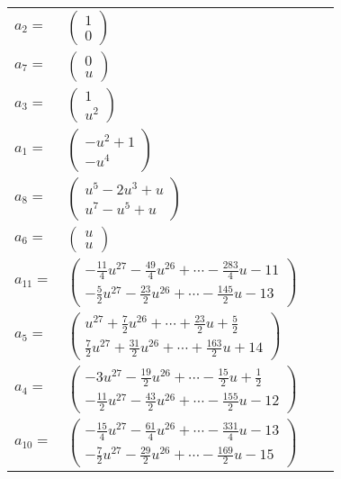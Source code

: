 \documentclass[1p]{elsarticle_modified}
\theoremstyle{definition}
\begin{document}
\begin{tabular}{m{7pt} m{180pt} m{7pt} m{180pt} }
\flushright $a_{2}=$&$\begin{pmatrix}1\\0\end{pmatrix}$ \\
\flushright $a_{7}=$&$\begin{pmatrix}0\\u\end{pmatrix}$ \\
\flushright $a_{3}=$&$\begin{pmatrix}1\\u^2\end{pmatrix}$ \\
\flushright $a_{1}=$&$\begin{pmatrix}- u^2+1\\- u^4\end{pmatrix}$ \\
\flushright $a_{8}=$&$\begin{pmatrix}u^5-2 u^3+u\\u^7- u^5+u\end{pmatrix}$ \\
\flushright $a_{6}=$&$\begin{pmatrix}u\\u\end{pmatrix}$ \\
\flushright $a_{11}=$&$\begin{pmatrix}-\frac{11}{4} u^{27}-\frac{49}{4} u^{26}+\cdots-\frac{283}{4} u-11\\-\frac{5}{2} u^{27}-\frac{23}{2} u^{26}+\cdots-\frac{145}{2} u-13\end{pmatrix}$ \\
\flushright $a_{5}=$&$\begin{pmatrix}u^{27}+\frac{7}{2} u^{26}+\cdots+\frac{23}{2} u+\frac{5}{2}\\\frac{7}{2} u^{27}+\frac{31}{2} u^{26}+\cdots+\frac{163}{2} u+14\end{pmatrix}$ \\
\flushright $a_{4}=$&$\begin{pmatrix}-3 u^{27}-\frac{19}{2} u^{26}+\cdots-\frac{15}{2} u+\frac{1}{2}\\-\frac{11}{2} u^{27}-\frac{43}{2} u^{26}+\cdots-\frac{155}{2} u-12\end{pmatrix}$ \\
\flushright $a_{10}=$&$\begin{pmatrix}-\frac{15}{4} u^{27}-\frac{61}{4} u^{26}+\cdots-\frac{331}{4} u-13\\-\frac{7}{2} u^{27}-\frac{29}{2} u^{26}+\cdots-\frac{169}{2} u-15\end{pmatrix}$ \\

\end{tabular}
\end{document}
